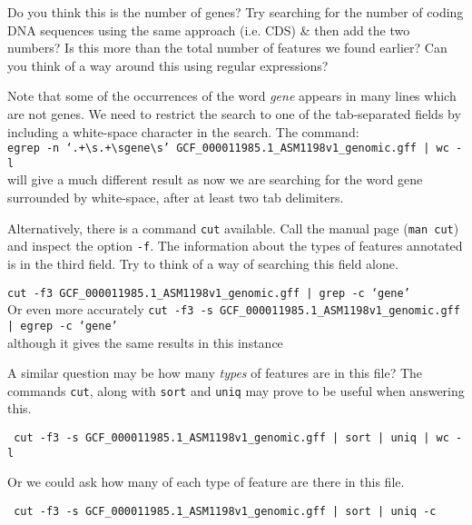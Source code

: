 \begin{questions}
Do you think this is the number of genes?
Try searching for the number of coding DNA sequences using the same approach (i.e. CDS) \& then add the two numbers?
Is this more than the total number of features we found earlier?
Can you think of a way around this using regular expressions?
\begin{answer}
Note that some of the occurrences of the word \textit{gene} appears in many lines which are not genes.
We need to restrict the search to one of the tab-separated fields by including a white-space character in the search.
The command:\\
\texttt{egrep -n `.+\textbackslash s.+\textbackslash sgene\textbackslash s' GCF\_000011985.1\_ASM1198v1\_genomic.gff | wc -l} \\
will give a much different result as now we are searching for the word gene surrounded by white-space, after at least two tab delimiters.
\end{answer}

Alternatively, there is a command \texttt{cut} available.
Call the manual page (\texttt{man cut}) and inspect the option \texttt{-f}.
The information about the types of features annotated is in the third field.
Try to think of a way of searching this field alone.
\begin{answer}
\texttt{cut -f3 GCF\_000011985.1\_ASM1198v1\_genomic.gff | grep -c `gene'}\\
Or even more accurately
\texttt{cut -f3 -s GCF\_000011985.1\_ASM1198v1\_genomic.gff | egrep -c `gene'}\\
although it gives the same results in this instance
\end{answer}
\end{questions}


\begin{bonus}
\begin{questions}

A similar question may be how many \textit{types} of features are in this file?
The commands \texttt{cut}, along with \texttt{sort} and \texttt{uniq} may prove to be useful when answering this.
\begin{answer}
\texttt{ cut -f3 -s GCF\_000011985.1\_ASM1198v1\_genomic.gff | sort | uniq | wc -l}
\end{answer}

Or we could ask how many of each type of feature are there in this file.
\begin{answer}
\texttt{ cut -f3 -s GCF\_000011985.1\_ASM1198v1\_genomic.gff | sort | uniq -c}
\end{answer}

\end{questions}
\end{bonus}



